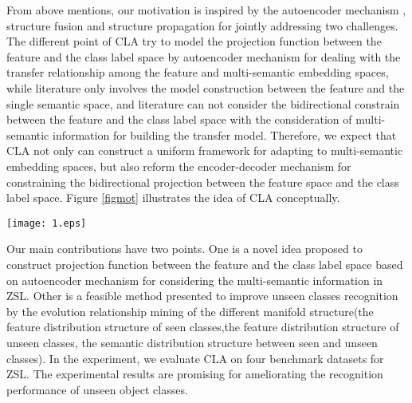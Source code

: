 \documentclass[review]{elsarticle}
\begin{document}
From above mentions, our motivation is inspired by the autoencoder mechanism \cite{Kodirov2017}, structure fusion \cite{Lin2017275} \cite{Lin20161} \cite{Lin2014146} \cite{7268821} \cite{7301305} \cite{Lin20131286} and structure propagation \cite{Lin2017Dynamic} \cite{Lin2018structure} for jointly addressing two challenges. The different point of CLA try to model the projection function between the feature and the class label space by autoencoder mechanism for dealing with the transfer relationship among the feature and multi-semantic embedding spaces, while literature \cite{Kodirov2017} only involves the model construction between the feature and the single semantic space, and literature \cite{Lin2018structure} can not consider the bidirectional constrain between the feature and the class label space with the consideration of multi-semantic information for building the transfer model. Therefore, we expect that CLA not only can construct a uniform framework for adapting to multi-semantic embedding spaces, but also reform the encoder-decoder mechanism for constraining the bidirectional projection between the feature space and the class label space. Figure \ref{figmot} illustrates the idea of CLA conceptually.

\begin{figure*}[ht]
  \begin{center}
\texttt{[image: 1.eps]}
\end{center}
\vspace{-0.2in}
 \caption{The illustration of class label autoencoder for zero-shot learning.}
  \label{figmot}
 \end{figure*}

Our main contributions have two points. One is a novel idea proposed to construct projection function between the feature and the class label space based on autoencoder mechanism for considering the multi-semantic information in ZSL. Other is a feasible method presented to improve unseen classes recognition by the evolution relationship mining of the different manifold structure(the feature distribution structure of seen classes,the feature distribution structure of unseen classes, the semantic distribution structure between seen and unseen classes). In the experiment, we evaluate CLA on four benchmark datasets for ZSL. The experimental results are promising for ameliorating the recognition performance of unseen object classes.
\end{document}
